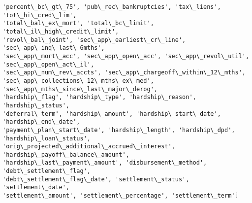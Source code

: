 \documentclass[11pt]{article}
\begin{document}
\begin{Verbatim}[commandchars=\\\{\},fontsize=\footnotesize]
'percent\_bc\_gt\_75', 'pub\_rec\_bankruptcies', 'tax\_liens', 'tot\_hi\_cred\_lim',
'total\_bal\_ex\_mort', 'total\_bc\_limit', 'total\_il\_high\_credit\_limit',
'revol\_bal\_joint', 'sec\_app\_earliest\_cr\_line', 'sec\_app\_inq\_last\_6mths',
'sec\_app\_mort\_acc', 'sec\_app\_open\_acc', 'sec\_app\_revol\_util', 'sec\_app\_open\_act\_il',
'sec\_app\_num\_rev\_accts', 'sec\_app\_chargeoff\_within\_12\_mths',
'sec\_app\_collections\_12\_mths\_ex\_med', 'sec\_app\_mths\_since\_last\_major\_derog',
'hardship\_flag', 'hardship\_type', 'hardship\_reason', 'hardship\_status',
'deferral\_term', 'hardship\_amount', 'hardship\_start\_date', 'hardship\_end\_date',
'payment\_plan\_start\_date', 'hardship\_length', 'hardship\_dpd', 'hardship\_loan\_status',
'orig\_projected\_additional\_accrued\_interest', 'hardship\_payoff\_balance\_amount',
'hardship\_last\_payment\_amount', 'disbursement\_method', 'debt\_settlement\_flag',
'debt\_settlement\_flag\_date', 'settlement\_status', 'settlement\_date',
'settlement\_amount', 'settlement\_percentage', 'settlement\_term']

    \end{Verbatim}
\end{document}
